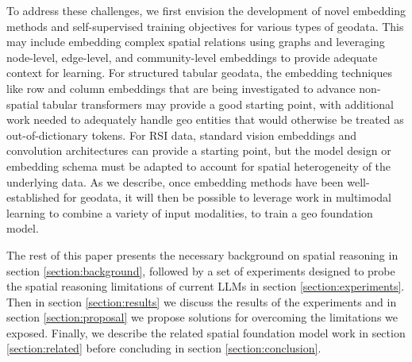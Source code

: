To address these challenges, we first envision the development of novel embedding methods and self-supervised training objectives for various types of geodata.
This may include embedding complex spatial relations using graphs and leveraging node-level, edge-level, and community-level embeddings to provide adequate context for learning.
For structured tabular geodata, the embedding techniques like row and column embeddings that are being investigated to advance non-spatial tabular transformers may provide a good starting point, with additional work needed to adequately handle geo entities that would otherwise be treated as out-of-dictionary tokens.
For RSI data, standard vision embeddings and convolution architectures can provide a starting point, but the model design or embedding schema must be adapted to account for spatial heterogeneity of the underlying data.
%
As we describe, once embedding methods have been well-established for geodata, it will then be possible to leverage work in multimodal learning to combine a variety of input modalities, to train a geo foundation model.

The rest of this paper presents the necessary background on spatial reasoning in section \ref{section:background}, followed by a set of experiments designed to probe the spatial reasoning limitations of current LLMs in section \ref{section:experiments}.
Then in section \ref{section:results} we discuss the results of the experiments and in section \ref{section:proposal} we propose solutions for overcoming the limitations we exposed.
Finally, we describe the related spatial foundation model work in section \ref{section:related} before concluding in section \ref{section:conclusion}. 




